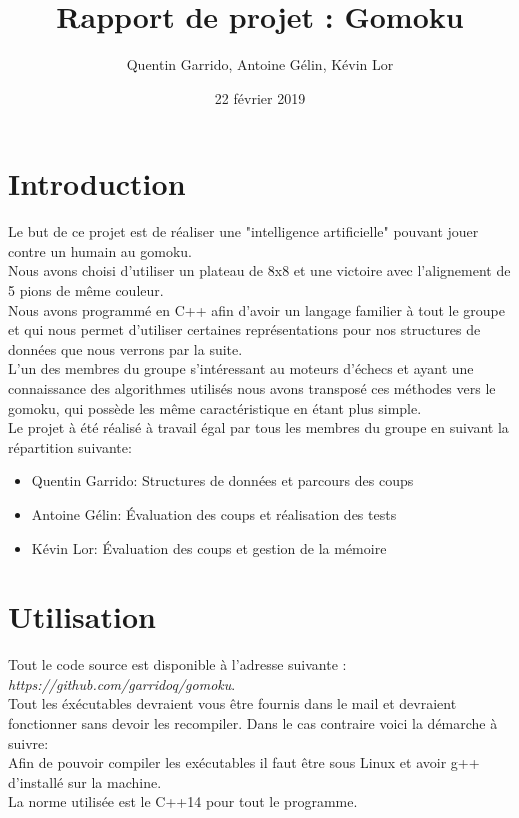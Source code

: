 \documentclass{article}
\title{Rapport de projet : Gomoku}
\author{Quentin Garrido, Antoine Gélin, Kévin Lor}
\date{22 février 2019}
\begin{document}
\maketitle
\tableofcontents
\pagebreak

\section{Introduction}

Le but de ce projet est de réaliser une "intelligence artificielle" pouvant jouer contre un humain au gomoku.\\
Nous avons choisi d'utiliser un plateau de 8x8 et une victoire avec l'alignement de 5 pions de même couleur.\\
Nous avons programmé en C++ afin d'avoir un langage familier à tout le groupe et qui nous permet d'utiliser
certaines représentations pour nos structures de données que nous verrons par la suite.\\
L'un des membres du groupe s'intéressant au moteurs d'échecs et ayant une connaissance des algorithmes utilisés
nous avons transposé ces méthodes vers le gomoku, qui possède les même caractéristique en étant plus simple.\\

Le projet à été réalisé à travail égal par tous les membres du groupe en suivant la répartition suivante:
\begin{itemize}
	\item Quentin Garrido: Structures de données et parcours des coups
	\item Antoine Gélin: Évaluation des coups et réalisation des tests
	\item Kévin Lor: Évaluation des coups et gestion de la mémoire
\end{itemize}

\section{Utilisation}

Tout le code source est disponible à l'adresse suivante : \textit{https://github.com/garridoq/gomoku}.\\

Tout les éxécutables devraient vous être fournis dans le mail et devraient fonctionner sans devoir
les recompiler. Dans le cas contraire voici la démarche à suivre:\\

Afin de pouvoir compiler les exécutables il faut être sous Linux et avoir g++ d'installé sur la machine.\\
La norme utilisée est le C++14 pour tout le programme.\\
\end{document}
